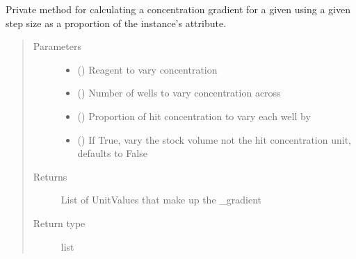 \documentclass[letterpaper,10pt,english]{sphinxmanual}
\begin{document}
\begin{fulllineitems}
\begin{fulllineitems}
\label{\detokenize{polo.widgets:polo.widgets.optimize_widget.OptimizeWidget._gradient}}
Private method for calculating a concentration gradient for a
given  using a given step size as a proportion of the
 instance’s {\hyperref[\detokenize{polo.crystallography:polo.crystallography.cocktail.Reagent.concentration}]{}}
attribute.
\begin{quote}\begin{description}
\item[{Parameters}] \leavevmode\begin{itemize}
\item {} 
 ({\hyperref[\detokenize{polo.crystallography:polo.crystallography.cocktail.Reagent}]{}}) \textendash{} Reagent to vary concentration

\item {} 
 () \textendash{} Number of wells to vary concentration across

\item {} 
 () \textendash{} Proportion of hit concentration to vary each well by

\item {} 
 (\sphinxstyleliteralemphasis{\sphinxupquote{, }}) \textendash{} If True, vary the stock volume not the hit
concentration unit, defaults to False

\end{itemize}

\item[{Returns}] \leavevmode
List of UnitValues that make up the \_gradient

\item[{Return type}] \leavevmode
list


\end{description}
\end{quote}
\end{fulllineitems}
\end{fulllineitems}
\end{document}
